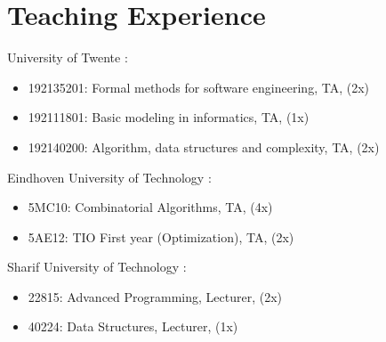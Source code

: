 \section{Teaching Experience}
\begin{CV}
\item [University of Twente]:

\hspace{-2cm}\parbox{\textwidth}{
\begin{itemize}
    \item 192135201: Formal methods for software engineering, TA, (2x)
    \item 192111801: Basic modeling in informatics, TA, (1x)
    \item 192140200: Algorithm, data structures and complexity, TA, (2x)
\end{itemize}}
\item [Eindhoven University of Technology]:

\hspace{-2cm}\parbox{\textwidth}{
\begin{itemize}
    \item 5MC10: Combinatorial Algorithms, TA, (4x)
    \item 5AE12: TIO First year (Optimization), TA, (2x)
\end{itemize}}
\item [Sharif University of Technology]:

\hspace{-2cm}\parbox{\textwidth}{
\begin{itemize}
    \item 22815: Advanced Programming, Lecturer, (2x)
    \item 40224: Data Structures, Lecturer, (1x)
\end{itemize}}
\end{CV}
